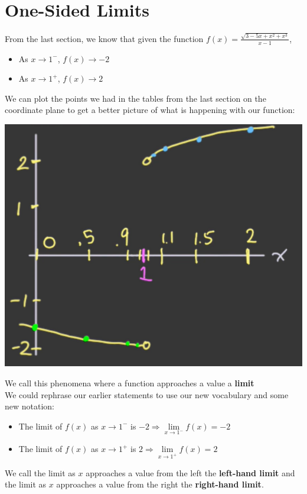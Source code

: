 \documentclass{article}
\begin{document}
\section{One-Sided Limits}
From the last section, we know that given the function $f(x) = \frac{\sqrt{3 - 5x + x^{2} + x^{3}}}{x - 1}$,
\begin{itemize}
    \item As $x \rightarrow 1^{-}$, $f(x) \rightarrow -2$
    \item As $x \rightarrow 1^{+}$, $f(x) \rightarrow 2$
\end{itemize}
We can plot the points we had in the tables from the last section on the coordinate plane to get a
better picture of what is happening with our function:
\begin{center}\includegraphics[scale = 0.5]{Images/OneSided1.png}\end{center}
We call this phenomena where a function approaches a value a \textbf{limit}
\\We could rephrase our earlier statements to use our new vocabulary and some new notation:
\begin{itemize}
    \item The limit of $f(x)$ as $x \rightarrow 1^{-}$ is $-2
        \Longrightarrow\underset{x \rightarrow 1^{-}}{\lim} f(x) = -2$
    \item The limit of $f(x)$ as $x \rightarrow 1^{+}$ is $2
        \Longrightarrow\underset{x \rightarrow 1^{+}}{\lim} f(x) = 2$
\end{itemize}
We call the limit as $x$ approaches a value from the left the \textbf{left-hand limit} and the limit
as $x$ approaches a value from the right the \textbf{right-hand limit}.
\end{document}
